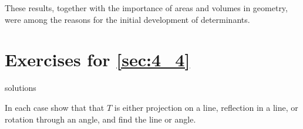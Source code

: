 \noindent These results, together with the importance of areas and volumes in geometry,
 were among the reasons for the initial development of determinants.


\section*{Exercises for \ref{sec:4_4}}

\begin{Filesave}{solutions}
\end{Filesave}

\begin{multicols}{2}
\begin{ex}
In each case show that that $T$ is either projection on a line, reflection in a line, or rotation through an angle, and find the line or angle.


\end{ex}
\end{multicols}
